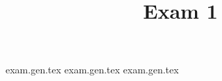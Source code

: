 

\title{Exam 1}
\date{}



\examcover

{exam.gen.tex}
\newpage
{exam.gen.tex}
\newpage
{exam.gen.tex}


